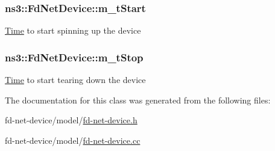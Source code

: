 \subsubsection[{\texorpdfstring{m\+\_\+t\+Start}{m_tStart}}]{ ns3\+::\+Fd\+Net\+Device\+::m\+\_\+t\+Start\hspace{0.3cm}{\ttfamily [private]}}\hypertarget{classns3_1_1FdNetDevice_a6349cf5842c54a0420f9e41422895efa}{}\label{classns3_1_1FdNetDevice_a6349cf5842c54a0420f9e41422895efa}
\hyperlink{classns3_1_1Time}{Time} to start spinning up the device 
\subsubsection[{\texorpdfstring{m\+\_\+t\+Stop}{m_tStop}}]{ ns3\+::\+Fd\+Net\+Device\+::m\+\_\+t\+Stop\hspace{0.3cm}{\ttfamily [private]}}\hypertarget{classns3_1_1FdNetDevice_ac97346af9ad4364aa3d1d7db0516fca5}{}\label{classns3_1_1FdNetDevice_ac97346af9ad4364aa3d1d7db0516fca5}
\hyperlink{classns3_1_1Time}{Time} to start tearing down the device 

The documentation for this class was generated from the following files\+:\begin{DoxyCompactItemize}
\item 
fd-\/net-\/device/model/\hyperlink{fd-net-device_8h}{fd-\/net-\/device.\+h}\item 
fd-\/net-\/device/model/\hyperlink{fd-net-device_8cc}{fd-\/net-\/device.\+cc}\end{DoxyCompactItemize}
